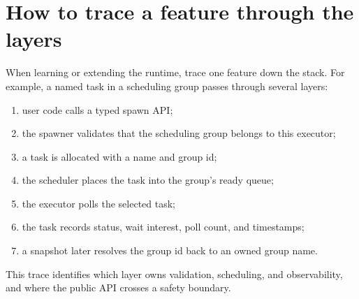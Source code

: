 \section{How to trace a feature through the layers}

When learning or extending the runtime, trace one feature down the stack. For
example, a named task in a scheduling group passes through several layers:

\begin{enumerate}
    \item user code calls a typed spawn API;
    \item the spawner validates that the scheduling group belongs to this
          executor;
    \item a task is allocated with a name and group id;
    \item the scheduler places the task into the group's ready queue;
    \item the executor polls the selected task;
    \item the task records status, wait interest, poll count, and timestamps;
    \item a snapshot later resolves the group id back to an owned group name.
\end{enumerate}

This trace identifies which layer owns validation, scheduling, and
observability, and where the public API crosses a safety boundary.
